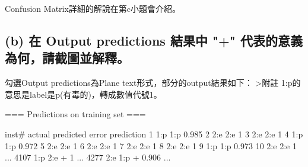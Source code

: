\documentclass[11pt]{article}
\newenvironment{Shaded}{}{}
\newcommand{\DecValTok}[1]{\textcolor[rgb]{0.25,0.63,0.44}{{#1}}}
\newcommand{\FloatTok}[1]{\textcolor[rgb]{0.25,0.63,0.44}{{#1}}}
\newcommand{\NormalTok}[1]{{#1}}
\newcommand{\OperatorTok}[1]{\textcolor[rgb]{0.40,0.40,0.40}{{#1}}}
\begin{document}
Confusion Matrix詳細的解說在第c小題會介紹。

    \subsection{(b) 在 Output predictions 結果中 "+"
代表的意義為何，請截圖並解釋。}\label{b-ux5728-output-predictions-ux7d50ux679cux4e2d-ux4ee3ux8868ux7684ux610fux7fa9ux70baux4f55ux8acbux622aux5716ux4e26ux89e3ux91cb}

勾選Output predictions為Plane text形式，部分的output結果如下：
\textgreater{}附註 1:p的意思是label是p(有毒的)，轉成數值代號1。

\begin{Shaded}
\begin{Highlighting}[]
\OperatorTok{===}\NormalTok{ Predictions on training set }\OperatorTok{===}

\NormalTok{    inst#     actual  predicted error prediction}
        \DecValTok{1}        \DecValTok{1}\OperatorTok{:}\NormalTok{p        }\DecValTok{1}\OperatorTok{:}\NormalTok{p       }\FloatTok{0.985} 
        \DecValTok{2}        \DecValTok{2}\OperatorTok{:}\NormalTok{e        }\DecValTok{2}\OperatorTok{:}\NormalTok{e       }\DecValTok{1} 
        \DecValTok{3}        \DecValTok{2}\OperatorTok{:}\NormalTok{e        }\DecValTok{2}\OperatorTok{:}\NormalTok{e       }\DecValTok{1} 
        \DecValTok{4}        \DecValTok{1}\OperatorTok{:}\NormalTok{p        }\DecValTok{1}\OperatorTok{:}\NormalTok{p       }\FloatTok{0.972} 
        \DecValTok{5}        \DecValTok{2}\OperatorTok{:}\NormalTok{e        }\DecValTok{2}\OperatorTok{:}\NormalTok{e       }\DecValTok{1} 
        \DecValTok{6}        \DecValTok{2}\OperatorTok{:}\NormalTok{e        }\DecValTok{2}\OperatorTok{:}\NormalTok{e       }\DecValTok{1} 
        \DecValTok{7}        \DecValTok{2}\OperatorTok{:}\NormalTok{e        }\DecValTok{2}\OperatorTok{:}\NormalTok{e       }\DecValTok{1} 
        \DecValTok{8}        \DecValTok{2}\OperatorTok{:}\NormalTok{e        }\DecValTok{2}\OperatorTok{:}\NormalTok{e       }\DecValTok{1} 
        \DecValTok{9}        \DecValTok{1}\OperatorTok{:}\NormalTok{p        }\DecValTok{1}\OperatorTok{:}\NormalTok{p       }\FloatTok{0.973} 
       \DecValTok{10}        \DecValTok{2}\OperatorTok{:}\NormalTok{e        }\DecValTok{2}\OperatorTok{:}\NormalTok{e       }\DecValTok{1} 
\NormalTok{       ...}
     \DecValTok{4107}        \DecValTok{1}\OperatorTok{:}\NormalTok{p        }\DecValTok{2}\OperatorTok{:}\NormalTok{e   }\OperatorTok{+}   \DecValTok{1} 
\NormalTok{       ...}
     \DecValTok{4277}        \DecValTok{2}\OperatorTok{:}\NormalTok{e        }\DecValTok{1}\OperatorTok{:}\NormalTok{p   }\OperatorTok{+}   \FloatTok{0.906} 
\NormalTok{       ...}
\end{Highlighting}
\end{Shaded}
\end{document}
